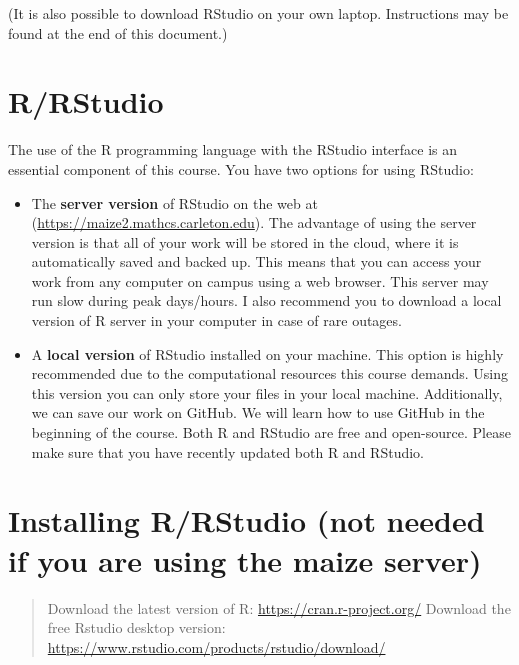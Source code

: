 \documentclass[
]{book}
\begin{document}
(It is also possible to download RStudio on your own laptop. Instructions may be found at the end of this document.)

\hypertarget{rrstudio}{%
\section{R/RStudio}\label{rrstudio}}

The use of the R programming language with the RStudio interface is an
essential component of this course. You have two options for using
RStudio:

\begin{itemize}
\item
  The \textbf{server version} of RStudio on the web at
  (\url{https://maize2.mathcs.carleton.edu}). The advantage of using the
  server version is that all of your work will be stored in the cloud,
  where it is automatically saved and backed up. This means that you
  can access your work from any computer on campus using a web
  browser. This server may run slow during peak days/hours. I also recommend
  you to download a local version of R server in your computer in case of rare outages.
\item
  A \textbf{local version} of RStudio installed on your machine. This
  option is highly recommended due to the computational resources this
  course demands. Using this version you can only store your files in your local machine. Additionally, we can save our work on GitHub. We will learn how to use GitHub in the beginning of the course. Both R and RStudio are free and open-source. Please make sure that you have recently updated both R and RStudio.
\end{itemize}

\hypertarget{installing-rrstudio-not-needed-if-you-are-using-the-maize-server}{%
\section{\texorpdfstring{\textbf{Installing R/RStudio (not needed if you are using the maize server)}}{Installing R/RStudio (not needed if you are using the maize server)}}\label{installing-rrstudio-not-needed-if-you-are-using-the-maize-server}}

\begin{quote}
Download the latest version of R: \url{https://cran.r-project.org/}
Download the free Rstudio desktop version: \url{https://www.rstudio.com/products/rstudio/download/}
\end{quote}
\end{document}
